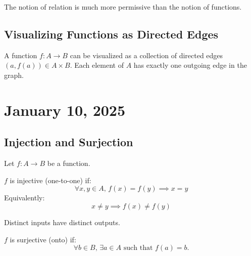 \documentclass[11pt, draft]{article}
\begin{document}
\begin{fact}
    The notion of relation is much more permissive than the notion of functions.
\end{fact}

\subsection{Visualizing Functions as Directed Edges}
A function $f: A \to B$ can be visualized as a collection of directed edges
$(a, f(a)) \in A \times B$. Each element of $A$ has exactly one outgoing edge
in the graph.

\begin{center}
\end{center}
\section{January 10, 2025}
\subsection{Injection and Surjection}

Let $f : A \to B$ be a function.

\begin{definition}

    $f$ is injective (one-to-one) if:
    \[
        \forall x, y \in A, \, f(x) = f(y) \implies x = y
    \]
    Equivalently:
    \[
        x \neq y \implies f(x) \neq f(y)
    \]\end{definition}

\begin{fact} Distinct inputs have distinct outputs.
\end{fact}

\begin{definition}

    $f$ is surjective (onto) if:
    \[
        \forall b \in B, \, \exists a \in A \text{ such that } f(a) = b.
    \]

\end{definition}
\end{document}
